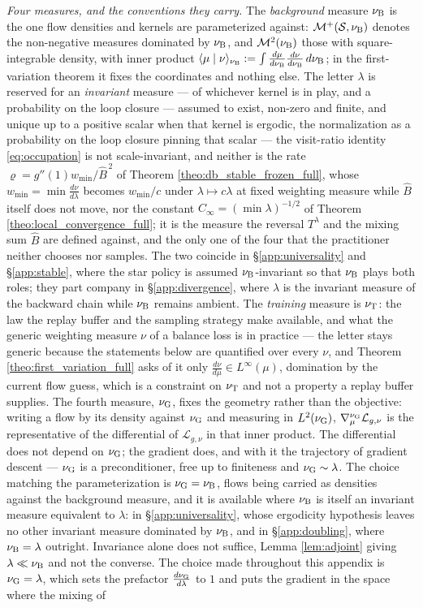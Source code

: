 \emph{Four measures, and the conventions they carry.} The \emph{background} measure $\nu_{\mathrm{B}}$ is the one flow densities and kernels are parameterized against: $\mathcal M^+(\mathcal S,\nu_{\mathrm{B}})$ denotes the non-negative measures dominated by $\nu_{\mathrm{B}}$, and $\mathcal M^2(\nu_{\mathrm{B}})$ those with square-integrable density, with inner product $\langle\mu\mid\nu\rangle_{\nu_{\mathrm{B}}}:=\int\frac{d\mu}{d\nu_{\mathrm{B}}}\frac{d\nu}{d\nu_{\mathrm{B}}}\,d\nu_{\mathrm{B}}$; in the first-variation theorem it fixes the coordinates and nothing else. The letter $\lambda$ is reserved for an \emph{invariant} measure --- of whichever kernel is in play, and a probability on the loop closure --- assumed to exist, non-zero and finite, and unique up to a positive scalar when that kernel is ergodic, the normalization as a probability on the loop closure pinning that scalar --- the visit-ratio identity \eqref{eq:occupation} is not scale-invariant, and neither is the rate $\varrho=g''(1)w_{\min}/\widehat B^{\,2}$ of Theorem \ref{theo:db_stable_frozen_full}, whose $w_{\min}=\min\frac{d\nu}{d\lambda}$ becomes $w_{\min}/c$ under $\lambda\mapsto c\lambda$ at fixed weighting measure while $\widehat B$ itself does not move, nor the constant $C_\infty=(\min\lambda)^{-1/2}$ of Theorem \ref{theo:local_convergence_full}; it is the measure the reversal $T^\lambda$ and the mixing sum $\widehat B$ are defined against, and the only one of the four that the practitioner neither chooses nor samples. The two coincide in \S\ref{app:universality} and \S\ref{app:stable}, where the star policy is assumed $\nu_{\mathrm{B}}$-invariant so that $\nu_{\mathrm{B}}$ plays both roles; they part company in \S\ref{app:divergence}, where $\lambda$ is the invariant measure of the backward chain while $\nu_{\mathrm{B}}$ remains ambient. The \emph{training} measure is $\nu_{\mathrm{T}}$: the law the replay buffer and the sampling strategy make available, and what the generic weighting measure $\nu$ of a balance loss is in practice --- the letter stays generic because the statements below are quantified over every $\nu$, and Theorem \ref{theo:first_variation_full} asks of it only $\frac{d\nu}{d\mu}\in L^\infty(\mu)$, domination by the current flow guess, which is a constraint on $\nu_{\mathrm{T}}$ and not a property a replay buffer supplies. The fourth measure, $\nu_{\mathrm{G}}$, fixes the geometry rather than the objective: writing a flow by its density against $\nu_{\mathrm{G}}$ and measuring in $L^2(\nu_{\mathrm{G}})$, $\nabla^{\nu_{\mathrm{G}}}_\mu\mathcal L_{g,\nu}$ is the representative of the differential of $\mathcal L_{g,\nu}$ in that inner product. The differential does not depend on $\nu_{\mathrm{G}}$; the gradient does, and with it the trajectory of gradient descent --- $\nu_{\mathrm{G}}$ is a preconditioner, free up to finiteness and $\nu_{\mathrm{G}}\sim\lambda$. The choice matching the parameterization is $\nu_{\mathrm{G}}=\nu_{\mathrm{B}}$, flows being carried as densities against the background measure, and it is available where $\nu_{\mathrm{B}}$ is itself an invariant measure equivalent to $\lambda$: in \S\ref{app:universality}, whose ergodicity hypothesis leaves no other invariant measure dominated by $\nu_{\mathrm{B}}$, and in \S\ref{app:doubling}, where $\nu_{\mathrm{B}}=\lambda$ outright. Invariance alone does not suffice, Lemma \ref{lem:adjoint} giving $\lambda\ll\nu_{\mathrm{B}}$ and not the converse. The choice made throughout this appendix is $\nu_{\mathrm{G}}=\lambda$, which sets the prefactor $\frac{d\nu_{\mathrm{G}}}{d\lambda}$ to $1$ and puts the gradient in the space where the mixing of 